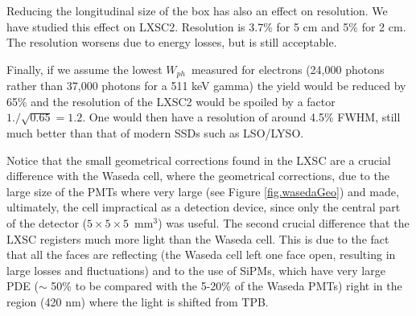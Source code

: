 Reducing the longitudinal size of the box has also an effect on resolution. We have studied this effect on LXSC2. Resolution is 3.7\% for 5 cm and 5\% for 2 cm. The resolution worsens due to energy losses, but is still acceptable. 

Finally, if we assume the lowest $W_{ph}$~measured for electrons
(24,000 photons rather than 37,000 photons for a 511 keV gamma)
 the yield would be reduced by 65\% and the resolution of the LXSC2 would be spoiled by a factor $1./\sqrt{0.65} = 1.2$. One would then have a resolution of around 4.5\% FWHM, still much better than that of modern SSDs such as LSO/LYSO.

Notice that the small geometrical corrections found in the LXSC are a crucial difference with the Waseda cell, where the geometrical corrections, due to the large size of the PMTs where very large (see Figure \ref{fig.wasedaGeo}) and made, ultimately, the cell impractical as a detection device, since only the central part of the detector ($5 \times 5 \times 5$~mm$^3$) was useful. The second crucial difference that the LXSC registers much more light than the Waseda cell. This is due to the fact that all the faces are reflecting (the Waseda cell left one face open, resulting in large losses and fluctuations) and to the use of SiPMs, which have very large PDE ($\sim$ 50\% to be compared with the 5-20\% of the Waseda PMTs) right in the region (420 nm) where the light is shifted from TPB. 

